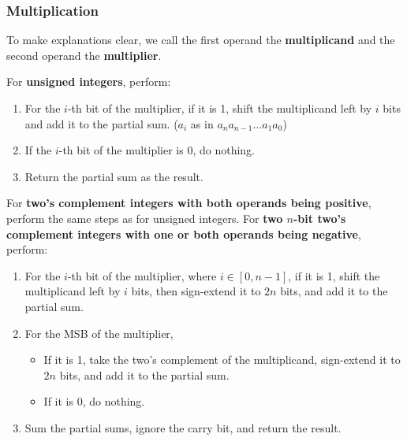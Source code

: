 \subsubsection{Multiplication}

To make explanations clear, we call the first operand the \textbf{multiplicand} and the second
operand the \textbf{multiplier}.

For \textbf{unsigned integers}, perform:
\begin{enumerate}
    \item For the $i$-th bit of the multiplier, if it is 1, shift the multiplicand left
        by $i$ bits and add it to the partial sum. ($a_i$ as in $a_na_{n-1}\ldots a_1a_0$)
    \item If the $i$-th bit of the multiplier is 0, do nothing.
    \item Return the partial sum as the result.
\end{enumerate}

For \textbf{two's complement integers with both operands being positive}, perform the same 
steps as for unsigned integers.
For \textbf{two $n$-bit two's complement integers with one or both operands being negative},
perform:
\begin{enumerate}
    \item For the $i$-th bit of the multiplier, where $i\in[0, n-1]$, if it is 1, shift the
        multiplicand left by $i$ bits, then sign-extend it to $2n$ bits, and add it to the 
        partial sum.
    \item For the MSB of the multiplier,
        \begin{itemize}
            \item If it is 1, take the two's complement of the multiplicand, sign-extend it
                to $2n$ bits, and add it to the partial sum.
            \item If it is 0, do nothing.
        \end{itemize}
    \item Sum the partial sums, ignore the carry bit, and return the result.
\end{enumerate}

